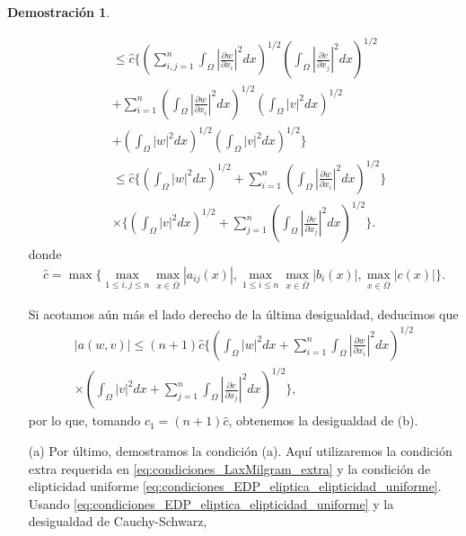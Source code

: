 \documentclass[a4paper,11pt,spanish, twoside, leqno]{tfg-uam}
\theoremstyle{definition}
\newtheorem{dem}[teor]{Demostración}
\begin{document}
\begin{dem}
\begin{itemize}
\begin{align*}
            &\leq \hat{c} \Bigg\{
            \left( \sum_{i,j=1}^n \int_\Omega \left| \frac{\partial w}{\partial x_i} \right|^2 dx \right)^{1/2}
            \left( \int_\Omega \left| \frac{\partial v}{\partial x_j} \right|^2 dx \right)^{1/2}\\
            &+ \sum_{i=1}^n \left( \int_\Omega \left| \frac{\partial w}{\partial x_i} \right|^2 dx \right)^{1/2}
            \left( \int_\Omega |v|^2 dx \right)^{1/2} \\
            &+ \left( \int_\Omega |w|^2 dx \right)^{1/2}
            \left( \int_\Omega |v|^2 dx \right)^{1/2}
            \Bigg\}\\
            &\leq \hat{c} \Bigg\{
            \left( \int_\Omega |w|^2 dx \right)^{1/2}
            + \sum_{i=1}^n \left( \int_\Omega \left| \frac{\partial w}{\partial x_i} \right|^2 dx \right)^{1/2}
            \Bigg\} \\
            &\times
            \Bigg\{
            \left( \int_\Omega |v|^2 dx \right)^{1/2}
            + \sum_{j=1}^n \left( \int_\Omega \left| \frac{\partial v}{\partial x_j} \right|^2 dx \right)^{1/2}
            \Bigg\}.
        \end{align*}
        donde
        \begin{align*}
            \hat{c} = \max \Bigg\{ \max_{1 \leq i,j \leq n} \max_{x \in \overline{\Omega}} |a_{ij}(x)|, \max_{1 \leq i \leq n} \max_{x \in \overline{\Omega}} |b_i(x)|, \max_{x \in \overline{\Omega}} |c(x)| \Bigg\}.
        \end{align*}

        Si acotamos aún más el lado derecho de la última desigualdad, deducimos que
        \begin{align*}
            |a(w, v)| \leq (n+1)\hat{c} \Bigg\{ \left(\int_{\Omega} |w|^2 dx + \sum_{i=1}^n \int_{\Omega} \left| \frac{\partial w}{\partial x_i} \right|^2 dx \right)^{1/2} \\
            \times \left(\int_{\Omega} |v|^2 dx + \sum_{j=1}^n \int_{\Omega} \left| \frac{\partial v}{\partial x_j} \right|^2 dx \right)^{1/2} \Bigg\},
        \end{align*}
        por lo que, tomando $c_1 = (n+1)\hat{c}$, obtenemos la desigualdad de (b).
        \item[(a)] Por último, demostramos la condición (a). Aquí utilizaremos la condición extra requerida en \eqref{eq:condiciones_LaxMilgram_extra} y la condición de elipticidad uniforme \eqref{eq:condiciones_EDP_eliptica_elipticidad_uniforme}. Usando  \eqref{eq:condiciones_EDP_eliptica_elipticidad_uniforme} y la desigualdad de Cauchy-Schwarz, 
        

\end{itemize}
\end{dem}
\end{document}
